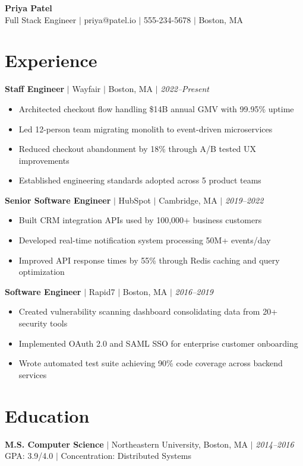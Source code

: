 \documentclass[10pt,a4paper]{article}
\begin{document}
{\centering
  {\huge\textbf{Priya Patel}} \\[3pt]
  Full Stack Engineer $|$ priya@patel.io $|$ 555-234-5678 $|$ Boston, MA \\
}

\section{Experience}

\textbf{Staff Engineer} $|$ Wayfair $|$ Boston, MA $|$ \textit{2022--Present}
\begin{itemize}
  \item Architected checkout flow handling \$14B annual GMV with 99.95\% uptime
  \item Led 12-person team migrating monolith to event-driven microservices
  \item Reduced checkout abandonment by 18\% through A/B tested UX improvements
  \item Established engineering standards adopted across 5 product teams
\end{itemize}

\textbf{Senior Software Engineer} $|$ HubSpot $|$ Cambridge, MA $|$ \textit{2019--2022}
\begin{itemize}
  \item Built CRM integration APIs used by 100,000+ business customers
  \item Developed real-time notification system processing 50M+ events/day
  \item Improved API response times by 55\% through Redis caching and query optimization
\end{itemize}

\textbf{Software Engineer} $|$ Rapid7 $|$ Boston, MA $|$ \textit{2016--2019}
\begin{itemize}
  \item Created vulnerability scanning dashboard consolidating data from 20+ security tools
  \item Implemented OAuth 2.0 and SAML SSO for enterprise customer onboarding
  \item Wrote automated test suite achieving 90\% code coverage across backend services
\end{itemize}

\section{Education}

\textbf{M.S. Computer Science} $|$ Northeastern University, Boston, MA $|$ \textit{2014--2016} \\
GPA: 3.9/4.0 $|$ Concentration: Distributed Systems
\end{document}
